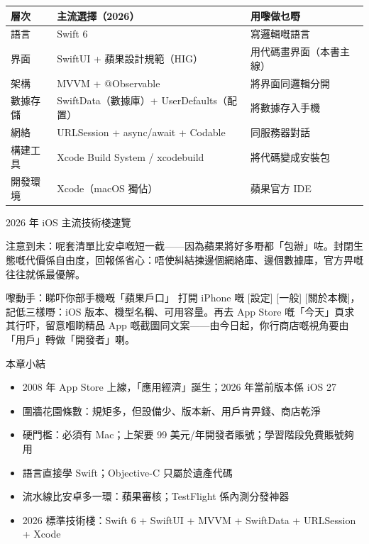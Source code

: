 
\begin{center}
\begin{tabularx}{\linewidth}{|X|X|X|}
\hline
\textbf{層次} & \textbf{主流選擇（2026）} & \textbf{用嚟做乜嘢} \tabularnewline
\hline
語言 & Swift 6 & 寫邏輯嘅語言 \tabularnewline
界面 & SwiftUI + 蘋果設計規範（HIG） & 用代碼畫界面（本書主線） \tabularnewline
架構 & MVVM + @Observable & 將界面同邏輯分開 \tabularnewline
數據存儲 & SwiftData（數據庫）+ UserDefaults（配置） & 將數據存入手機 \tabularnewline
網絡 & URLSession + async/await + Codable & 同服務器對話 \tabularnewline
構建工具 & Xcode Build System / xcodebuild & 將代碼變成安裝包 \tabularnewline
開發環境 & Xcode（macOS 獨佔） & 蘋果官方 IDE \tabularnewline
\hline
\end{tabularx}
\end{center}

\begin{center}\small\color{gray}2026 年 iOS 主流技術棧速覽\end{center}

注意到未：呢套清單比安卓嘅短一截——因為蘋果將好多嘢都「包辦」咗。封閉生態嘅代價係自由度，回報係省心：唔使糾結揀邊個網絡庫、邊個數據庫，官方畀嘅往往就係最優解。

\begin{tcbpractice}{嚟動手：睇吓你部手機嘅「蘋果戶口」}
打開 iPhone 嘅 [設定] [一般] [關於本機]，記低三樣嘢：iOS 版本、機型名稱、可用容量。再去 App Store 嘅「今天」頁求其行吓，留意嗰啲精品 App 嘅截圖同文案——由今日起，你行商店嘅視角要由「用戶」轉做「開發者」喇。

\end{tcbpractice}

\begin{tcbsummary}{本章小結}
\begin{itemize}
  \item 2008 年 App Store 上線，「應用經濟」誕生；2026 年當前版本係 iOS 27
  \item 圍牆花園條數：規矩多，但設備少、版本新、用戶肯畀錢、商店乾淨
  \item 硬門檻：必須有 Mac；上架要 99 美元/年開發者賬號；學習階段免費賬號夠用
  \item 語言直接學 Swift；Objective-C 只屬於遺產代碼
  \item 流水線比安卓多一環：蘋果審核；TestFlight 係內測分發神器
  \item 2026 標準技術棧：Swift 6 + SwiftUI + MVVM + SwiftData + URLSession + Xcode
\end{itemize}

\end{tcbsummary}
